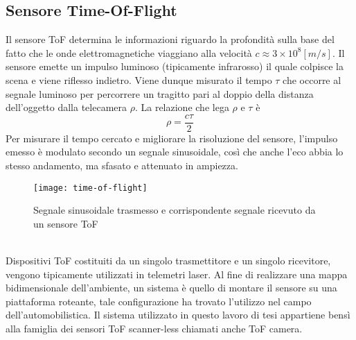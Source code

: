 \subsection{Sensore Time-Of-Flight}
Il sensore ToF determina le informazioni riguardo la profondità sulla base del fatto che le onde elettromagnetiche viaggiano alla velocità \(c\approx3\times 10^8[m/s]\). Il sensore emette un impulso luminoso (tipicamente infrarosso) il quale colpisce la scena e viene riflesso indietro. Viene dunque misurato il tempo $\tau$ che occorre al segnale luminoso per percorrere un tragitto pari al doppio della distanza dell'oggetto dalla telecamera $\rho$. La relazione che lega $\rho$ e $\tau$ è $$\rho=\frac{c\tau}{2}$$
Per misurare il tempo cercato e migliorare la risoluzione del sensore, l'impulso emesso è modulato secondo un segnale sinusoidale, così che anche l'eco abbia lo stesso andamento, ma
sfasato e attenuato in ampiezza.
\begin{figure}[ht]
    \centering
    \texttt{[image: time-of-flight]}
    \caption[Principio time-of-flight]{Segnale sinusoidale trasmesso e corrispondente segnale ricevuto da un sensore ToF}
    \label{tof}
\end{figure}\\
Dispositivi ToF costituiti da un singolo trasmettitore e un singolo ricevitore, vengono tipicamente utilizzati in telemetri laser. Al fine di realizzare una mappa bidimensionale dell'ambiente, un sistema è quello di montare il sensore su una piattaforma roteante, tale configurazione ha trovato l'utilizzo nel campo dell'automobilistica. Il sistema utilizzato in questo lavoro di tesi appartiene bensì alla famiglia dei sensori ToF scanner-less chiamati anche ToF camera.
